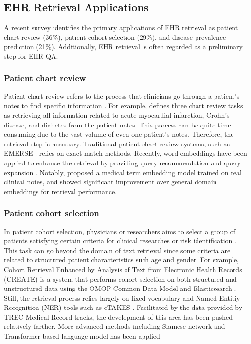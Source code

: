 \subsection{EHR Retrieval Applications}
A recent survey \cite{sivarajkumar2024clinical} identifies the primary applications of EHR retrieval as patient chart review (36\%), patient cohort selection (29\%), and disease prevalence prediction (21\%). 
Additionally, EHR retrieval is often regarded as a preliminary step for EHR QA.

\subsubsection{Patient chart review}
Patient chart review refers to the process that clinicians go through a patient's notes to find specific information \cite{ye2018extracting}.
For example, \citet{ye2021leveraging} defines three chart review tasks as retrieving all information related to acute myocardial infarction, Crohn’s disease, and diabetes from the patient notes.
This process can be quite time-consuming due to the vast volume of even one patient's notes.
Therefore, the retrieval step is necessary.
Traditional patient chart review systems, such as EMERSE \cite{Hanauer2015SupportingIR}, relies on exact match methods.
Recently, word embeddings have been applied to enhance the retrieval by providing query recommendation and query expansion \cite{ye2018extracting, Sun2021UsingNI}.
Notably, \citet{ye2021leveraging} proposed a medical term embedding model trained on real clinical notes, and showed significant improvement over general domain embeddings for retrieval performance.

\subsubsection{Patient cohort selection}
In patient cohort selection, physicians or researchers aims to select a group of patients satisfying certain criteria for clinical researches or risk identification \citep{sivarajkumar2024clinical}.
This task can go beyond the domain of text retrieval since some criteria are related to structured patient characteristics such age and gender. 
For example, Cohort Retrieval Enhanced by Analysis of Text from Electronic Health Records (CREATE) is a system that performs cohort selection on both structured and unstructured data using the OMOP Common Data Model and Elasticsearch \cite{Liu2020ImplementationOA}. 
Still, the retrieval process relies largely on fixed vocabulary and Named Entitiy Recognition (NER) tools such as cTAKES \cite{Savova2010MayoCT}.
Facilitated by the data provided by TREC Medical Record tracks, the development of this area has been pushed relatively farther.
More advanced methods including Siamese network \cite{Xiao2020PatientTM} and Transformer-based language model \cite{Soni2020PatientCR} has been applied.


